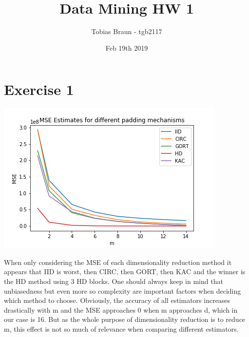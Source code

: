 \documentclass[11pt]{article}
\title{Data Mining HW 1}
\author{Tobias Braun - tgb2117}
\date{Feb 19th 2019}
\begin{document}
\maketitle
\section*{Exercise 1}

\includegraphics{MSE_Estimates.png}

When only considering the MSE of each dimensionality reduction method it appears
that IID is worst, then CIRC, then GORT, then KAC and the winner is the HD method 
using 3 HD blocks. One should always keep in mind that unbiasedness but even more 
so complexity are important factors when deciding which method to choose. 
Obviously, the accuracy of all estimators increases drastically with m and the 
MSE approaches 0 when m approaches d, which in our case is 16. But as the whole 
purpose of dimensionality reduction is to reduce m, this effect is not so much of
relevance when comparing different estimators.
\end{document}
